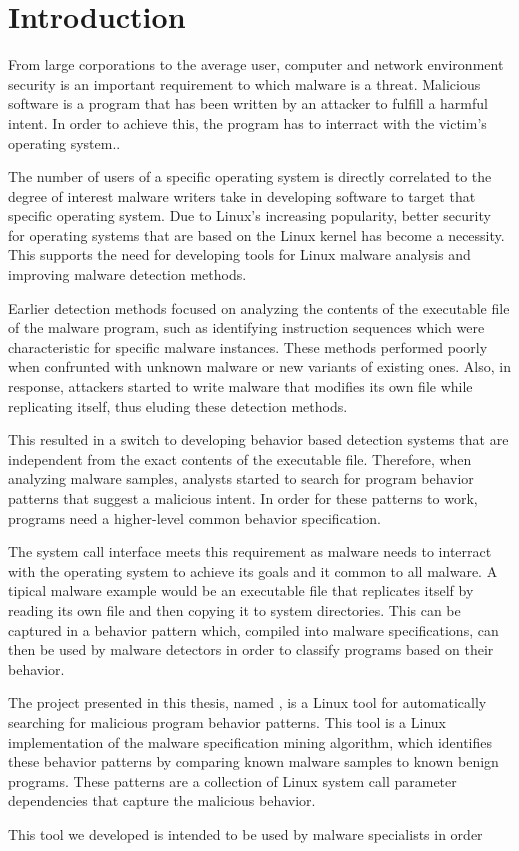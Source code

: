 \chapter{Introduction}
\label{chapter:intro}

From large corporations to the average user, computer and network environment security is an important requirement to which malware is a threat. Malicious software is a program that has been written by an attacker to fulfill a harmful intent. In order to achieve this, the program has to interract with the victim's operating system..

The number of users of a specific operating system is directly correlated to the degree of interest malware writers take in developing software to target that specific operating system. Due to Linux's increasing popularity, better security for operating systems that are based on the Linux kernel has become a necessity. This supports the need for developing tools for Linux malware analysis and improving malware detection methods.

Earlier detection methods focused on analyzing the contents of the executable file of the malware program, such as identifying instruction sequences which were characteristic for specific malware instances. These methods performed poorly when confrunted with unknown malware or new variants of existing ones. Also, in response, attackers started to write malware that modifies its own file while replicating itself, thus eluding these detection methods.

This resulted in a switch to developing behavior based detection systems that are independent from the exact contents of the executable file. Therefore, when analyzing malware samples, analysts started to search for program behavior patterns that suggest a malicious intent. In order for these patterns to work, programs need a higher-level common behavior specification.

The system call interface meets this requirement as malware needs to interract with the operating system to achieve its goals and it common to all malware. A tipical malware example would be an executable file that replicates itself by reading its own file and then copying it to system directories. This can be captured in a behavior pattern which, compiled into malware specifications, can then be used by malware detectors in order to classify programs based on their behavior.

The project presented in this thesis, named \project, is a Linux tool for automatically searching for malicious program behavior patterns. This tool is a Linux implementation of the malware specification mining algorithm, which identifies these behavior patterns by comparing known malware samples to known benign programs. These patterns are a collection of Linux system call parameter dependencies that capture the malicious behavior.

This tool we developed is intended to be used by malware specialists in order